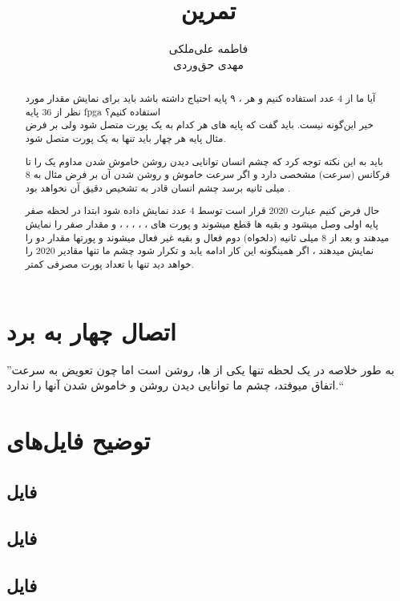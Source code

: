 \documentclass[dvipsnames, svgnames, x11names, a4paper, 11pt]{article}
\title{تمرین \lr{7-Segement}}
\author{
فاطمه علی‌ملکی \\
مهدی حق‌وردی
}
\begin{document}
\maketitle
\tableofcontents

\section{اتصال چهار  به برد }
\begin{abstract}
آیا ما از 4 عدد  استفاده کنیم و هر ، ۹ پایه احتیاج داشته باشد باید برای نمایش مقدار مورد نظر از 36 پایه fpga استفاده کنیم؟ \\

خیر این‌گونه نیست. باید گفت که پایه های
هر کدام به یک پورت متصل شود ولی بر فرض مثال پایه  هر چهار  باید تنها به یک پورت متصل شود.

باید به این نکته توجه کرد که چشم انسان توانایی دیدن روشن خاموش شدن مداوم یک  را تا فرکانس (سرعت) مشخصی دارد و اگر سرعت خاموش و روشن شدن آن بر فرض مثال به 8 میلی ثانیه برسد چشم انسان  قادر به تشخیص دقیق آن نخواهد بود .

حال فرض کنیم عبارت 2020 قرار است توسط 4 عدد  نمایش داده شود ابتدا در لحظه صفر پایه  اولی وصل میشود  و بقیه  ها قطع میشوند و پورت های 
،
،
،
، 
،
 و
مقدار صفر را نمایش میدهند و بعد از 8 میلی ثانیه (دلخواه)  دوم فعال و بقیه غیر فعال میشوند و پورتها مقدار دو را نمایش میدهند ، اگر همینگونه این کار ادامه یابد و تکرار شود چشم ما تنها مقادیر 2020 را خواهد دید تنها با تعداد پورت مصرفی کمتر.
\end{abstract}\label{abstract}
''به طور خلاصه در یک لحظه تنها یکی از ها، روشن است اما چون تعویض به سرعت اتفاق میوفتد، چشم ما توانایی دیدن روشن و خاموش شدن آنها را ندارد.``

\section{توضیح فایل‌های }
\subsection{فایل }\label{sec:cd}
\subsection{فایل }\label{sec:dss}
\subsection{فایل }\label{sec:ss}
\end{document}
